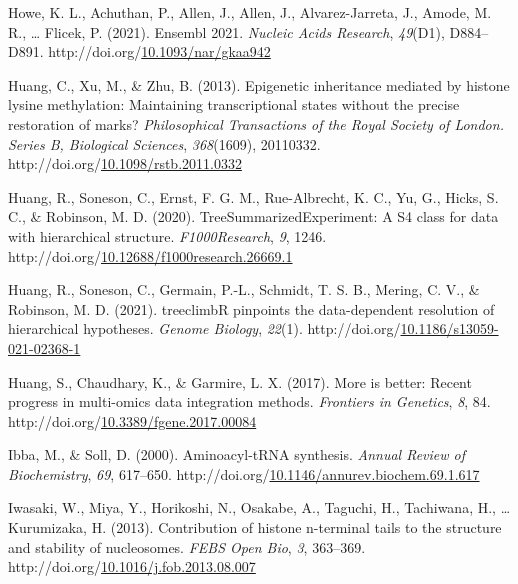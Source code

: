\documentclass[12pt,twoside]{reedthesis}
\newlength{\cslhangindent}
\newenvironment{CSLReferences}[2] %
 {%
  \setlength{\parindent}{0pt}
  \ifodd #1 \everypar{\setlength{\hangindent}{\cslhangindent}}\ignorespaces\fi
  \ifnum #2 > 0
  \setlength{\parskip}{#2\baselineskip}
  \fi
 }%
 {}
\begin{document}
\begin{CSLReferences}{1}{0}
\leavevmode{}%
Howe, K. L., Achuthan, P., Allen, J., Allen, J., Alvarez-Jarreta, J., Amode, M. R., \ldots{} Flicek, P. (2021). Ensembl 2021. \emph{Nucleic Acids Research}, \emph{49}(D1), D884--D891. http://doi.org/\href{https://doi.org/10.1093/nar/gkaa942}{10.1093/nar/gkaa942}

\leavevmode{}%
Huang, C., Xu, M., \& Zhu, B. (2013). Epigenetic inheritance mediated by histone lysine methylation: Maintaining transcriptional states without the precise restoration of marks? \emph{Philosophical Transactions of the Royal Society of London. Series B, Biological Sciences}, \emph{368}(1609), 20110332. http://doi.org/\href{https://doi.org/10.1098/rstb.2011.0332}{10.1098/rstb.2011.0332}

\leavevmode{}%
Huang, R., Soneson, C., Ernst, F. G. M., Rue-Albrecht, K. C., Yu, G., Hicks, S. C., \& Robinson, M. D. (2020). TreeSummarizedExperiment: A S4 class for data with hierarchical structure. \emph{F1000Research}, \emph{9}, 1246. http://doi.org/\href{https://doi.org/10.12688/f1000research.26669.1}{10.12688/f1000research.26669.1}

\leavevmode{}%
Huang, R., Soneson, C., Germain, P.-L., Schmidt, T. S. B., Mering, C. V., \& Robinson, M. D. (2021). treeclimbR pinpoints the data-dependent resolution of hierarchical hypotheses. \emph{Genome Biology}, \emph{22}(1). http://doi.org/\href{https://doi.org/10.1186/s13059-021-02368-1}{10.1186/s13059-021-02368-1}

\leavevmode{}%
Huang, S., Chaudhary, K., \& Garmire, L. X. (2017). More is better: Recent progress in multi-omics data integration methods. \emph{Frontiers in Genetics}, \emph{8}, 84. http://doi.org/\href{https://doi.org/10.3389/fgene.2017.00084}{10.3389/fgene.2017.00084}

\leavevmode{}%
Ibba, M., \& Soll, D. (2000). Aminoacyl-tRNA synthesis. \emph{Annual Review of Biochemistry}, \emph{69}, 617--650. http://doi.org/\href{https://doi.org/10.1146/annurev.biochem.69.1.617}{10.1146/annurev.biochem.69.1.617}

\leavevmode{}%
Iwasaki, W., Miya, Y., Horikoshi, N., Osakabe, A., Taguchi, H., Tachiwana, H., \ldots{} Kurumizaka, H. (2013). Contribution of histone n-terminal tails to the structure and stability of nucleosomes. \emph{FEBS Open Bio}, \emph{3}, 363--369. http://doi.org/\href{https://doi.org/10.1016/j.fob.2013.08.007}{10.1016/j.fob.2013.08.007}


\end{CSLReferences}
\end{document}
